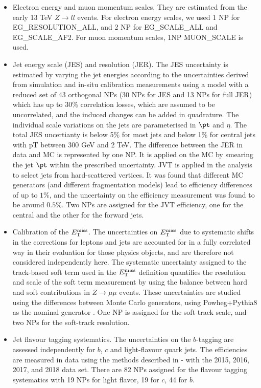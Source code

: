 \begin{itemize}
\item Electron energy and muon momentum scales. They are estimated from the early 13 TeV $Z\to ll$ events. For electron energy scales, we used 1 NP for EG\_RESOLUTION\_ALL, and 2 NP for EG\_SCALE\_ALL and EG\_SCALE\_AF2. For muon momentum scales, 1NP MUON\_SCALE is used.
\item Jet energy scale (JES) and resolution (JER). The JES uncertainty is estimated by varying the jet energies according to the uncertainties derived from simulation and in-situ calibration measurements using a model with a reduced set of 43 orthogonal NPs (30 NPs for JES and 13 NPs for full JER) \cite{jet_sys} which has up to 30\% correlation losses, which are assumed to be uncorrelated, and the induced changes can be added in quadrature. The individual scale variations on the jets are parameterised in $\pt$ and $\eta$. The total JES uncertianty is below 5\% for most jets and below 1\% for central jets with pT between 300 GeV and 2 TeV.
The difference between the JER in data and MC is represented by one NP. It is applied on the MC by smearing the jet $\pt$ within the prescribed uncertainty.
JVT is applied in the analysis to select jets from hard-scattered vertices. It was found that different MC generators (and different fragmentation models) lead to efficiency differences of up to $1\%$, and the uncertainty on the efficiency measurement was found to be around $0.5\%$. Two NPs are assigned for the JVT efficiency, one for the central and the other for the forward jets.
\item Calibration of the $E_{\text{T}}^{\text{miss}}$. The uncertainties on $E_{\text{T}}^{\text{miss}}$ due to systematic shifts in the corrections for leptons and jets are accounted for in a fully correlated way in their evaluation for those physics objects, and are therefore not considered independently here. The systematic uncertainty assigned to the track-based soft term used in the $E_{\text{T}}^{\text{miss}}$ definition quantifies the resolution and scale of the soft term measurement by using the balance between hard and soft contributions in $Z\to\mu\mu$ events. These uncertainties are studied using the differences between Monte Carlo generators, using Powheg+Pythia8 as the nominal generator \cite{met_sys}. One NP is assigned for the soft-track scale, and two NPs for the soft-track resolution.
\item Jet flavour tagging systematics. The uncertainties on the $b$-tagging are assessed independently for $b$, $c$ and light-flavour quark jets\cite{btag_sys1}. The efficiencies are measured in data using the methods described in \cite{btag_sys2}-\cite{btag_sys3} with the 2015, 2016, 2017, and 2018 data set. There are 82 NPs assigned for the flavour tagging systematics with 19 NPs for light flavor, 19 for $c$, 44 for $b$.

\end{itemize}
